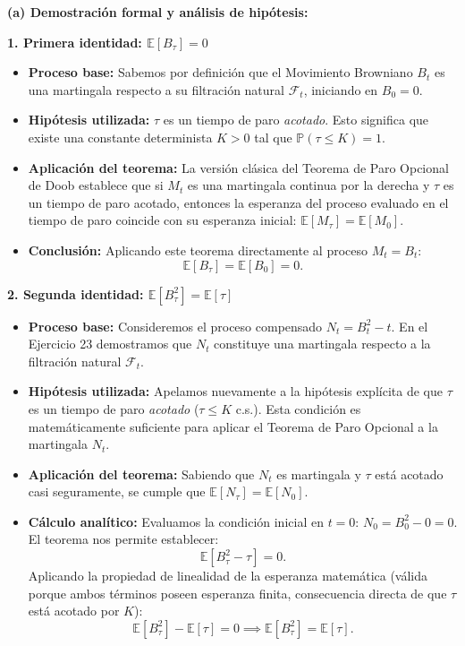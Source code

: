 \documentclass[11pt, letterpaper]{article}
\begin{document}
\begin{solucion}
    \vspace{3mm}
    \textbf{(a) Demostración formal y análisis de hipótesis:}

    \textbf{1. Primera identidad: $\mathbb{E}[B_\tau] = 0$}
    \begin{itemize}
        \item \textbf{Proceso base:} Sabemos por definición que el Movimiento Browniano $B_t$ es una martingala respecto a su filtración natural $\mathcal{F}_t$, iniciando en $B_0 = 0$.
        \item \textbf{Hipótesis utilizada:} $\tau$ es un tiempo de paro \textit{acotado}. Esto significa que existe una constante determinista $K > 0$ tal que $\mathbb{P}(\tau \le K) = 1$.
        \item \textbf{Aplicación del teorema:} La versión clásica del Teorema de Paro Opcional de Doob establece que si $M_t$ es una martingala continua por la derecha y $\tau$ es un tiempo de paro acotado, entonces la esperanza del proceso evaluado en el tiempo de paro coincide con su esperanza inicial: $\mathbb{E}[M_\tau] = \mathbb{E}[M_0]$.
        \item \textbf{Conclusión:} Aplicando este teorema directamente al proceso $M_t = B_t$:
        \[ \mathbb{E}[B_\tau] = \mathbb{E}[B_0] = 0. \]
    \end{itemize}

    \textbf{2. Segunda identidad: $\mathbb{E}[B_\tau^2] = \mathbb{E}[\tau]$}
    \begin{itemize}
        \item \textbf{Proceso base:} Consideremos el proceso compensado $N_t = B_t^2 - t$. En el Ejercicio 23 demostramos que $N_t$ constituye una martingala respecto a la filtración natural $\mathcal{F}_t$.
        \item \textbf{Hipótesis utilizada:} Apelamos nuevamente a la hipótesis explícita de que $\tau$ es un tiempo de paro \textit{acotado} ($\tau \le K$ c.s.). Esta condición es matemáticamente suficiente para aplicar el Teorema de Paro Opcional a la martingala $N_t$.
        \item \textbf{Aplicación del teorema:} Sabiendo que $N_t$ es martingala y $\tau$ está acotado casi seguramente, se cumple que $\mathbb{E}[N_\tau] = \mathbb{E}[N_0]$.
        \item \textbf{Cálculo analítico:} Evaluamos la condición inicial en $t=0$: $N_0 = B_0^2 - 0 = 0$.
        El teorema nos permite establecer:
        \[ \mathbb{E}[B_\tau^2 - \tau] = 0. \]
        Aplicando la propiedad de linealidad de la esperanza matemática (válida porque ambos términos poseen esperanza finita, consecuencia directa de que $\tau$ está acotado por $K$):
        \[ \mathbb{E}[B_\tau^2] - \mathbb{E}[\tau] = 0 \implies \mathbb{E}[B_\tau^2] = \mathbb{E}[\tau]. \]
    \end{itemize}


\end{solucion}
\end{document}
